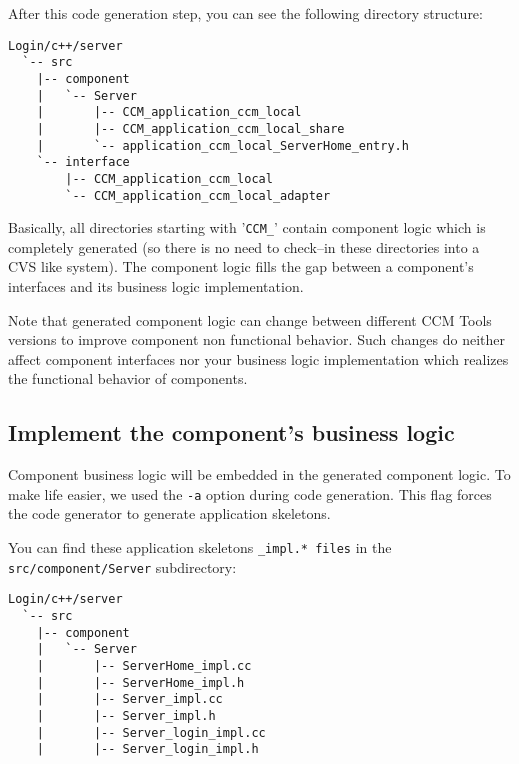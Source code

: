After this code generation step, you can see the following directory structure:
\begin{footnotesize}
\begin{verbatim}
Login/c++/server
  `-- src
    |-- component
    |   `-- Server
    |       |-- CCM_application_ccm_local
    |       |-- CCM_application_ccm_local_share
    |       `-- application_ccm_local_ServerHome_entry.h
    `-- interface
        |-- CCM_application_ccm_local
        `-- CCM_application_ccm_local_adapter
\end{verbatim}
\end{footnotesize}

Basically, all directories starting with '{\tt CCM\_}' contain component logic
which is completely generated (so there is no need to check--in these directories
into a CVS like system).
The component logic fills the gap between a component's interfaces and its
business logic implementation. 

\vspace{3mm}
Note that generated component logic can change between different CCM Tools
versions to improve component non functional behavior. Such changes do neither
affect component interfaces nor your business logic implementation which
realizes the functional behavior of components.   


\subsection{Implement the component's business logic}
\label{subsection:ImplementC++BusinessLogic}

Component business logic will be embedded in the generated component logic.
To make life easier, we used the {\tt -a} option during code generation.
This flag forces the code generator to generate application skeletons.

\vspace{3mm}
You can find these application skeletons {\tt *\_impl.* files} in the 
{\tt src/component/Server} subdirectory:
\begin{footnotesize}
\begin{verbatim}
Login/c++/server
  `-- src
    |-- component
    |   `-- Server
    |       |-- ServerHome_impl.cc
    |       |-- ServerHome_impl.h
    |       |-- Server_impl.cc
    |       |-- Server_impl.h
    |       |-- Server_login_impl.cc
    |       |-- Server_login_impl.h
\end{verbatim}
\end{footnotesize}

